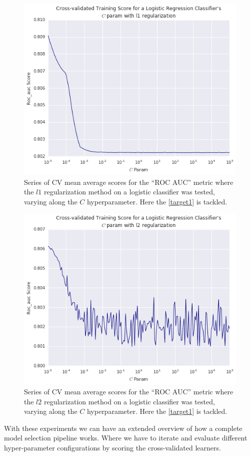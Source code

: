 \begin{figure}[h!]
	\begin{center}
		\includegraphics[width=1\linewidth]{figures/cross_validation/logreg_cv_regularization_l1_rocauc_series}
		\caption{Series of CV mean average scores for the ``ROC AUC'' metric where the $l1$ regularization method on a logistic classifier was tested, varying along the $C$ hyperparameter.
			Here the \cref{target1} is tackled.}
		\label{fig:rocauc_logreg_cv_l1_regularized_comparison}
	\end{center}
\end{figure}



\begin{figure}[h!]
	\begin{center}
		 \includegraphics[width=1\linewidth]{figures/cross_validation/logreg_cv_regularization_l2_rocauc_series}
		\caption{Series of CV mean average scores for the ``ROC AUC'' metric where the $l2$ regularization method on a logistic classifier was tested, varying along the $C$ hyperparameter.
			Here the \cref{target1} is tackled.}
		\label{fig:rocauc_logreg_cv_l2_regularized_comparison}
	\end{center}
\end{figure}


With these experiments we can have an extended overview of how a complete model selection pipeline works. Where we have to iterate and evaluate different hyper-parameter configurations by scoring the cross-validated learners.
